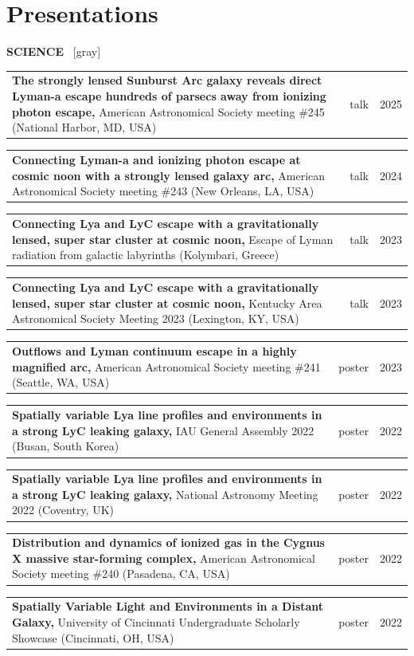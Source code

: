 \documentclass[11pt]{article}
\makeatletter
\newcommand{\presentation}[4]{
    {
    \noindent
    \begin{tabularx}{\textwidth}{@{} X rr @{}}
        \textbf{#1,} {\color{gray}\fontseries{normal}\selectfont #2}
        & #3 & #4 \\
    \end{tabularx}
    \addvspace{0.1cm}
    }
}
\makeatother
\begin{document}




\section{Presentations}

\textbf{SCIENCE} ~\xdotfill{1pt}[gray]
\addvspace{0.3cm}

\presentation{The strongly lensed Sunburst Arc galaxy reveals direct Lyman-a escape hundreds of parsecs away from ionizing photon escape}{American Astronomical Society meeting \#245 (National Harbor, MD, USA)}{talk}{2025}

\presentation{Connecting Lyman-a and ionizing photon escape at cosmic noon with a strongly lensed galaxy arc}{American Astronomical Society meeting \#243 (New Orleans, LA, USA)}{talk}{2024}

\presentation{Connecting Lya and LyC escape with a gravitationally lensed, super star cluster at cosmic noon}{Escape of Lyman radiation from galactic labyrinths (Kolymbari, Greece)}{talk}{2023}

\presentation{Connecting Lya and LyC escape with a gravitationally lensed, super star cluster at cosmic noon}{Kentucky Area Astronomical Society Meeting 2023 (Lexington, KY, USA)}{talk}{2023}

\presentation{Outflows and Lyman continuum escape in a highly magnified arc}{American Astronomical Society meeting \#241 (Seattle, WA, USA)}{poster}{2023}

\presentation{Spatially variable Lya line profiles and environments in a strong LyC leaking galaxy}{IAU General Assembly 2022 (Busan, South Korea)}{poster}{2022}

\presentation{Spatially variable Lya line profiles and environments in a strong LyC leaking galaxy}{National Astronomy Meeting 2022 (Coventry, UK)}{poster}{2022}

\presentation{Distribution and dynamics of ionized gas in the Cygnus X massive star-forming complex}{American Astronomical Society meeting \#240 (Pasadena, CA, USA)}{poster}{2022}

\presentation{Spatially Variable Light and Environments in a Distant Galaxy}{University of Cincinnati Undergraduate Scholarly Showcase (Cincinnati, OH, USA)}{poster}{2022}
\end{document}
